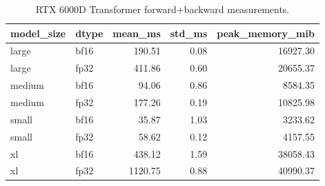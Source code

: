\begin{table}
\caption{RTX 6000D Transformer forward+backward measurements.}
\label{tab:transformer-measured}
\begin{tabular}{llrrr}
\toprule
model_size & dtype & mean_ms & std_ms & peak_memory_mib \\
\midrule
large & bf16 & 190.51 & 0.08 & 16927.30 \\
large & fp32 & 411.86 & 0.60 & 20655.37 \\
medium & bf16 & 94.06 & 0.86 & 8584.35 \\
medium & fp32 & 177.26 & 0.19 & 10825.98 \\
small & bf16 & 35.87 & 1.03 & 3233.62 \\
small & fp32 & 58.62 & 0.12 & 4157.55 \\
xl & bf16 & 438.12 & 1.59 & 38058.43 \\
xl & fp32 & 1120.75 & 0.88 & 40990.37 \\
\bottomrule
\end{tabular}
\end{table}
